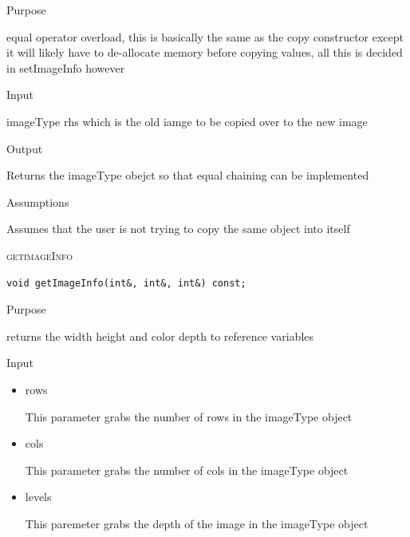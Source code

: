 \documentclass[pdftex, 11pt]{article}
\begin{document}
\begin{description}
\begin{description}
			\item{Purpose}

				equal operator overload, this is basically
				the same as the copy constructor
				except it will likely have to 
				de-allocate memory before copying values, all
				this is decided in setImageInfo however

			\item{Input}

				imageType rhs which is the old iamge to be 
				copied over to the new image

			\item{Output}

				Returns the imageType obejct so that
				equal chaining can be implemented


			\item{Assumptions}

				Assumes that the user is not trying to copy the same
				object into itself


		\end{description}


	\item{\textsc{getimageInfo}}
		\begin{description}

\begin{lstlisting}
void getImageInfo(int&, int&, int&) const;
\end{lstlisting}

			\item{Purpose}
			
 				returns the width height and color depth 
				to reference variables

			\item{Input}

				\begin{itemize}
					\item{rows}

						This parameter grabs the number of rows
						in the imageType object

					\item{cols}

						This parameter grabs the number of cols
						in the imageType object

					\item{levels}

						This paremeter grabs the depth of the
						image in the imageType object

				\end{itemize}


\end{description}
\end{description}
\end{document}
